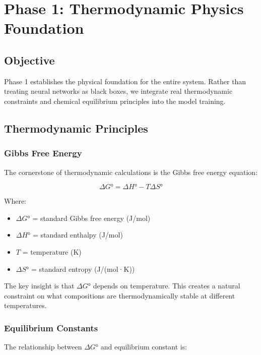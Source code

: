 \documentclass[12pt,a4paper,oneside]{report}
\begin{document}
\chapter{Phase 1: Thermodynamic Physics Foundation}

\section{Objective}

Phase 1 establishes the physical foundation for the entire system. Rather than treating neural networks as black boxes, we integrate real thermodynamic constraints and chemical equilibrium principles into the model training.

\section{Thermodynamic Principles}

\subsection{Gibbs Free Energy}

The cornerstone of thermodynamic calculations is the Gibbs free energy equation:

\begin{equation}
\Delta G° = \Delta H° - T\Delta S°
\label{eq:gibbs}
\end{equation}

Where:
\begin{itemize}
    \item $\Delta G°$ = standard Gibbs free energy (J/mol)
    \item $\Delta H°$ = standard enthalpy (J/mol)
    \item $T$ = temperature (K)
    \item $\Delta S°$ = standard entropy (J/(mol·K))
\end{itemize}

The key insight is that $\Delta G°$ depends on temperature. This creates a natural constraint on what compositions are thermodynamically stable at different temperatures.

\subsection{Equilibrium Constants}

The relationship between $\Delta G°$ and equilibrium constant is:
\end{document}
